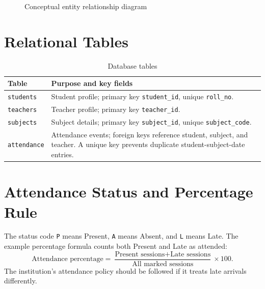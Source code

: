 \documentclass[12pt,a4paper]{report}
\begin{document}
\begin{figure}[htbp]
\centering
{}
\caption{Conceptual entity relationship diagram}
\end{figure}

\section{Relational Tables}
\begin{table}[htbp]
\centering
\begin{tabular}{p{3cm}p{10cm}}
\toprule
\textbf{Table} & \textbf{Purpose and key fields} \\
\midrule
\texttt{students} & Student profile; primary key \texttt{student\_id}, unique \texttt{roll\_no}. \\
\texttt{teachers} & Teacher profile; primary key \texttt{teacher\_id}. \\
\texttt{subjects} & Subject details; primary key \texttt{subject\_id}, unique \texttt{subject\_code}. \\
\texttt{attendance} & Attendance events; foreign keys reference student, subject, and teacher. A unique key prevents duplicate student-subject-date entries. \\
\bottomrule
\end{tabular}
\caption{Database tables}
\end{table}

\section{Attendance Status and Percentage Rule}
The status code \texttt{P} means Present, \texttt{A} means Absent, and \texttt{L} means Late. The example percentage formula counts both Present and Late as attended:
\[
\text{Attendance percentage} =
\frac{\text{Present sessions}+\text{Late sessions}}{\text{All marked sessions}}
\times 100.
\]
The institution's attendance policy should be followed if it treats late arrivals differently.
\end{document}
